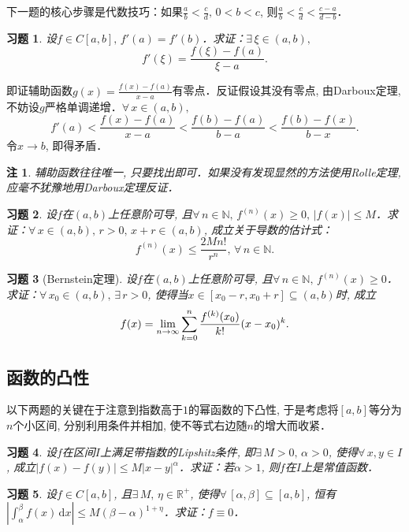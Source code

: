 \documentclass[11pt,a4paper]{ctexart}
\makeatletter
\theoremstyle{thmseries} %
\theoremstyle{exerseries}
\newtheorem{exer}{习题}[section]
\newtheorem*{rem}{注}
\renewenvironment{proof}[1][\proofname]{\par
  \pushQED{\qed}%
  \normalfont \topsep6\p@\@plus6\p@\relax
  \trivlist
  \item[\hskip\labelsep
        \itshape
    #1\@addpunct{}]\ignorespaces
}{%
  \popQED\endtrivlist\@endpefalse
}
\newenvironment{pf}{\begin{proof}[\bfseries\upshape 证\quad]}{\end{proof}}
\newcommand{\R}{\mathbb{R}}
\newcommand{\N}{\mathbb{N}}
\renewcommand{\d}{\mathrm{d}}
\def \nti {\mathnormal{n}\to\infty}
\makeatother
\begin{document}
下一题的核心步骤是代数技巧：如果$\frac{a}{b}<\frac{c}{d},\,0<b<c$, 则$\frac{a}{b}<\frac{c}{d}<\frac{c-a}{d-b}$．
\begin{exer}
	设$f\in C[a,b],\,f'(a)=f'(b)$．求证：$\exists\,\xi\in(a,b),$
	\[f'(\xi)=\frac{f(\xi)-f(a)}{\xi-a}.\]
\end{exer}
\begin{pf}
	即证辅助函数$g(x)=\frac{f(x)-f(a)}{x-a}$有零点．反证假设其没有零点, 由Darboux定理, 不妨设$g$严格单调递增．$\forall\,x\in(a,b),$
	\[f'(a)<\frac{f(x)-f(a)}{x-a}<\frac{f(b)-f(a)}{b-a}<\frac{f(b)-f(x)}{b-x}.\]
	令$x\to b$, 即得矛盾．
\end{pf}
\begin{rem}
	辅助函数往往唯一, 只要找出即可．如果没有发现显然的方法使用Rolle定理, 应毫不犹豫地用Darboux定理反证．
\end{rem}

\begin{exer}
	设$f$在$(a,b)$上任意阶可导, 且$\forall\,n\in\N,\,f^{(n)}(x)\geq0,\,|f(x)|\leq M$．求证：$\forall\,x\in(a,b),\,r>0,\,x+r\in(a,b)$, 成立关于导数的估计式：
	\[f^{(n)}(x)\leq\frac{2Mn!}{r^n},\,\forall\,n\in\N.\]
\end{exer}

\begin{exer}[Bernstein定理]
	设$f$在$(a,b)$上任意阶可导, 且$\forall\,n\in\N,\,f^{(n)}(x)\geq0$．求证：$\forall\,x_0\in(a,b),\,\exists\,r>0$, 使得当$x\in[x_0-r,x_0+r]\subseteq(a,b)$时, 成立
	\[f(x)=\lim_{\nti}\sum_{k=0}^{n}\frac{f^{(k)}(x_0)}{k!}(x-x_0)^k.\]
\end{exer}


\subsection{函数的凸性}
以下两题的关键在于注意到指数高于$1$的幂函数的下凸性, 于是考虑将$[a,b]$等分为$n$个小区间, 分别利用条件并相加, 使不等式右边随$n$的增大而收紧．
\begin{exer}
	设$f$在区间$I$上满足带指数的Lipshitz条件, 即$\exists\,M>0,\,\alpha>0$, 使得$\forall\,x,y\in I$, 成立$|f(x)-f(y)|\leq M|x-y|^\alpha$．求证：若$\alpha>1$, 则$f$在$I$上是常值函数．
\end{exer}

\begin{exer}
	设$f\in C[a,b]$, 且$\exists\,M,\,\eta\in\R^+$, 使得$\forall\,[\alpha,\beta]\subseteq[a,b]$, 恒有$\left|\int_{\alpha}^{\beta}f(x)\,\d x\right|\leq M(\beta-\alpha)^{1+\eta}$．求证：$f\equiv0$．
\end{exer}
\end{document}
